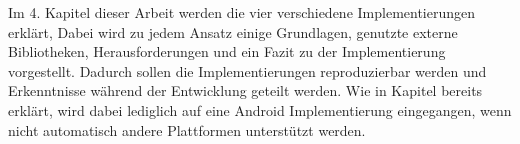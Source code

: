Im 4. Kapitel dieser Arbeit werden die vier verschiedene Implementierungen erklärt, Dabei wird zu jedem Ansatz einige Grundlagen, genutzte externe Bibliotheken, Herausforderungen und ein Fazit zu der Implementierung vorgestellt. Dadurch sollen die Implementierungen reproduzierbar werden und Erkenntnisse während der Entwicklung geteilt werden. Wie in Kapitel \label{cha:3_3abgrenzung} bereits erklärt, wird dabei lediglich  auf eine Android Implementierung eingegangen, wenn nicht automatisch andere Plattformen unterstützt werden. 








